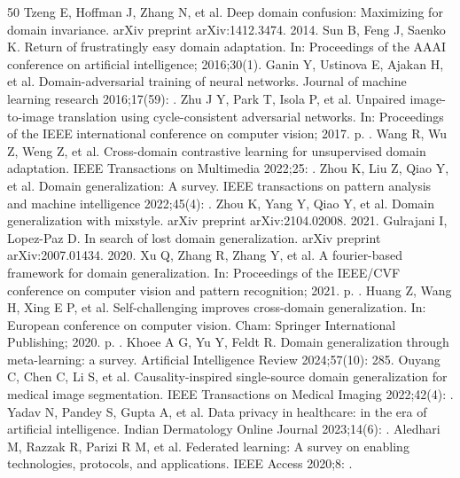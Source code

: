 \begin{thebibliography}{50}
Tzeng E, Hoffman J, Zhang N, et al. Deep domain confusion: Maximizing for domain invariance. arXiv preprint arXiv:1412.3474. 2014.
Sun B, Feng J, Saenko K. Return of frustratingly easy domain adaptation. In: \allowbreak Proceedings of the AAAI conference on artificial intelligence; 2016;30(1).
Ganin Y, Ustinova E, Ajakan H, et al. Domain-adversarial training of neural networks. Journal of machine learning research 2016;17(59): .
Zhu J Y, Park T, Isola P, et al. Unpaired image-to-image translation using cycle-consistent adversarial networks. In: Proceedings of the IEEE international conference on computer vision; 2017. p. .
Wang R, Wu Z, Weng Z, et al. Cross-domain contrastive learning for unsupervised domain adaptation. IEEE Transactions on Multimedia 2022;25: .
Zhou K, Liu Z, Qiao Y, et al. Domain generalization: A survey. IEEE transactions on pattern analysis and machine intelligence 2022;45(4): .
Zhou K, Yang Y, Qiao Y, et al. Domain generalization with mixstyle. arXiv preprint arXiv:2104.02008. 2021.
Gulrajani I, Lopez-Paz D. In search of lost domain generalization. arXiv preprint arXiv:2007.01434. 2020.
Xu Q, Zhang R, Zhang Y, et al. A fourier-based framework for domain generalization. In: Proceedings of the IEEE/CVF conference on computer vision and pattern recognition; 2021. p. .
Huang Z, Wang H, Xing E P, et al. Self-challenging improves cross-domain generalization. In: European conference on computer vision. Cham: Springer International Publishing; 2020. p. .
Khoee A G, Yu Y, Feldt R. Domain generalization through meta-learning: a survey. Artificial Intelligence Review 2024;57(10): 285.
Ouyang C, Chen C, Li S, et al. Causality-inspired single-source domain generalization for medical image segmentation. IEEE Transactions on Medical Imaging 2022;42(4): .
Yadav N, Pandey S, Gupta A, et al. Data privacy in healthcare: in the era of artificial intelligence. Indian Dermatology Online Journal 2023;14(6): .
Aledhari M, Razzak R, Parizi R M, et al. Federated learning: A survey on enabling technologies, protocols, and applications. IEEE Access 2020;8: .

\end{thebibliography}
